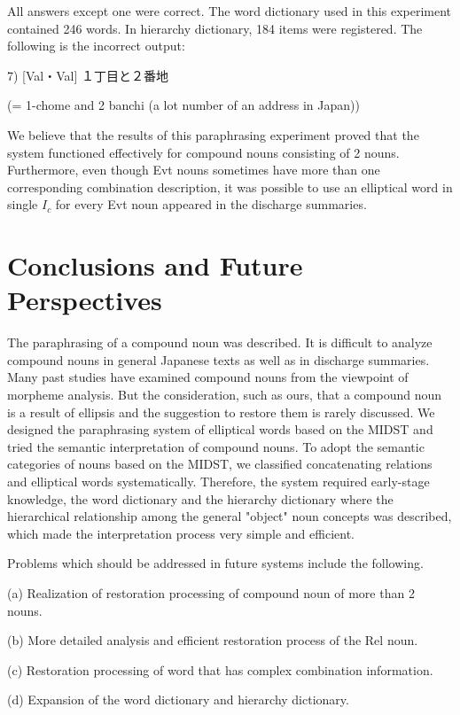 All answers except one were correct. The word dictionary
used in this experiment contained 246 words. In hierarchy dictionary,
184 items were registered. The following is the incorrect output:
\begin{list}{}{}
\item[7)] [Val・Val] １丁目と２番地
\item (= 1-chome and 2 banchi (a lot number of an address in Japan))
\end{list}

We believe that the results of this paraphrasing experiment proved
that the system functioned effectively for compound nouns consisting
of 2 nouns. Furthermore, even though Evt nouns sometimes have more
than one corresponding combination description, it was possible to use
an elliptical word in single $I_c$ for every Evt noun appeared in the
discharge summaries.

\section{Conclusions and Future Perspectives}
The paraphrasing of a compound noun was described. It is difficult to
analyze compound nouns in general Japanese texts as well as in
discharge summaries. Many past studies have examined compound nouns
from the viewpoint of morpheme analysis. But the consideration, such
as ours, that a compound noun is a result of ellipsis and the
suggestion to restore them is rarely discussed.  We designed the
paraphrasing system of elliptical words based on the MIDST and tried
the semantic interpretation of compound nouns. To adopt the semantic
categories of nouns based on the MIDST, we classified concatenating
relations and elliptical words systematically.  Therefore, the system
required early-stage knowledge, the word dictionary and the hierarchy
dictionary where the hierarchical relationship among the general
"object" noun concepts was described, which made the interpretation
process very simple and efficient.

Problems which should be addressed in future systems include the
following.
\begin{list}{}{}
\item[(a)] Realization of restoration processing of compound noun of 
more than 2 nouns.
\item[(b)] More detailed analysis and efficient restoration process of the
Rel noun.
\item[(c)] Restoration processing of word that has complex combination 
information.
\item[(d)] Expansion of the word dictionary and hierarchy dictionary.
\end{list}

